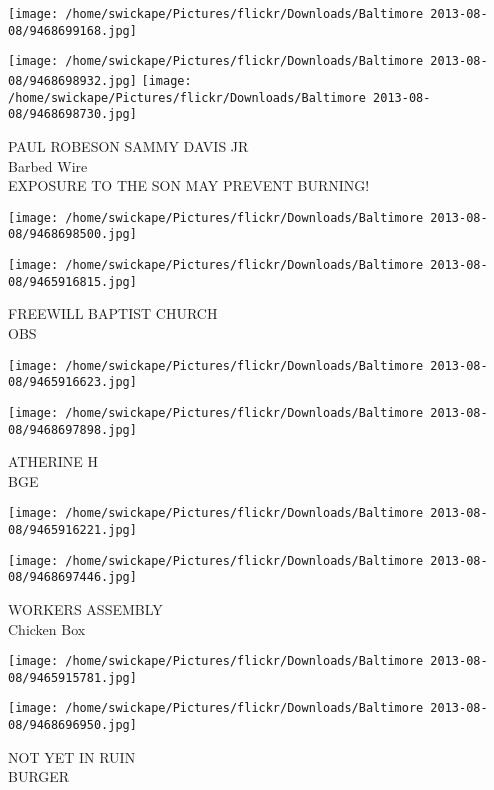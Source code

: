 \documentclass[10pt,letterpaper]{article}
\begin{document}
\texttt{[image: /home/swickape/Pictures/flickr/Downloads/Baltimore 2013-08-08/9468699168.jpg]}

\vspace{0.25in}
\texttt{[image: /home/swickape/Pictures/flickr/Downloads/Baltimore 2013-08-08/9468698932.jpg]}
\texttt{[image: /home/swickape/Pictures/flickr/Downloads/Baltimore 2013-08-08/9468698730.jpg]}

PAUL ROBESON SAMMY DAVIS JR\\
Barbed Wire\\
EXPOSURE TO THE SON MAY PREVENT BURNING!
\pagebreak

\texttt{[image: /home/swickape/Pictures/flickr/Downloads/Baltimore 2013-08-08/9468698500.jpg]}

\vspace{0.25in}
\texttt{[image: /home/swickape/Pictures/flickr/Downloads/Baltimore 2013-08-08/9465916815.jpg]}

FREEWILL BAPTIST CHURCH\\
OBS
\pagebreak

\texttt{[image: /home/swickape/Pictures/flickr/Downloads/Baltimore 2013-08-08/9465916623.jpg]}

\vspace{0.25in}
\texttt{[image: /home/swickape/Pictures/flickr/Downloads/Baltimore 2013-08-08/9468697898.jpg]}

ATHERINE H\\
BGE
\pagebreak

\texttt{[image: /home/swickape/Pictures/flickr/Downloads/Baltimore 2013-08-08/9465916221.jpg]}

\vspace{0.25in}
\texttt{[image: /home/swickape/Pictures/flickr/Downloads/Baltimore 2013-08-08/9468697446.jpg]}

WORKERS ASSEMBLY\\
Chicken Box
\pagebreak

\texttt{[image: /home/swickape/Pictures/flickr/Downloads/Baltimore 2013-08-08/9465915781.jpg]}

\vspace{0.25in}
\texttt{[image: /home/swickape/Pictures/flickr/Downloads/Baltimore 2013-08-08/9468696950.jpg]}

NOT YET IN RUIN\\
BURGER
\pagebreak
\end{document}
